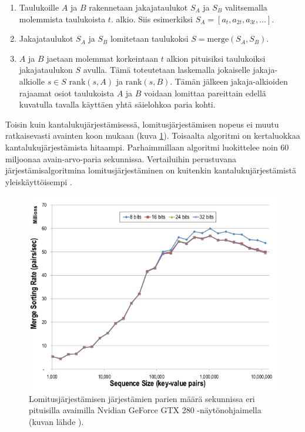 \documentclass[a4paper,11pt]{article}
\begin{document}
\begin{singlespace*}
\begin{enumerate}
\item Taulukoille $A$ ja $B$ rakennetaan jakajataulukot $S_A$ ja $S_B$ valitsemalla molemmista taulukoista $t$. alkio. Siis esimerkiksi $S_A = [a_t, a_{2t}, a_{3t}, ...]$.
\item Jakajataulukot $S_A$ ja $S_B$ lomitetaan taulukoksi $S = \mathrm{merge}(S_A, S_B)$.
\item $A$ ja $B$ jaetaan molemmat korkeintaan $t$ alkion pituisiksi taulukoiksi jakajataulukon $S$ avulla. Tämä toteutetaan laskemalla jokaiselle jakaja-alkiolle $s \in S$ $\mathrm{rank}(s, A)$ ja $\mathrm{rank}(s, B)$. Tämän jälkeen jakaja-alkioiden rajaamat osiot taulukoista $A$ ja $B$ voidaan lomittaa pareittain edellä kuvatulla tavalla käyttäen yhtä säielohkoa paria kohti.
\end{enumerate}
\end{singlespace*}

Toisin kuin kantalukujärjestämisessä, lomitusjärjestämisen nopeus ei muutu ratkaisevasti avainten koon mukaan (kuva \ref{fig:merge_sort_varying_key_size}). Toisaalta algoritmi on kertaluokkaa kantalukujärjestämista hitaampi. Parhaimmillaan algoritmi luokittelee noin 60 miljoonaa avain-arvo-paria sekunnissa. Vertailuihin perustuvana järjestämisalgoritmina lomitusjärjestäminen on kuitenkin kantalukujärjestämistä yleiskäyttöisempi \cite{clrs}.

\begin{figure}
\centering
\includegraphics[scale = 0.45]{satish_mergesort}
\caption{Lomitusjärjestämisen järjestämien parien määrä sekunnissa eri pituisilla avaimilla Nvidian GeForce GTX 280 -näytönohjaimella (kuvan lähde \cite{satish2009}).}
\label{fig:merge_sort_varying_key_size}
\end{figure}
\end{document}

